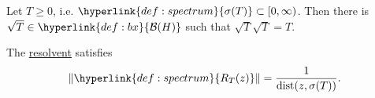 \documentclass{article}
\begin{document}
\begin{cor}
    Let $T \geq 0$, i.e. $\hyperlink{def:spectrum}{\sigma(T)} \subset [0, \infty)$.
    Then there is $\sqrt{T} \in \hyperlink{def:bx}{\mathcal{B}(H)}$ such that $\sqrt{T} \sqrt{T} =T$.
\end{cor}

\begin{cor}
    The \hyperlink{def:spectrum}{resolvent} satisfies
    \begin{equation*}
        \|\hyperlink{def:spectrum}{R_T(z)}\| = \frac{1}{\mathrm{dist}(z, \sigma(T))}.
    \end{equation*}
\end{cor}
\end{document}
